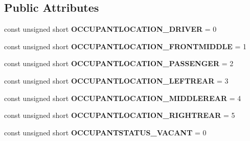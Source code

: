 \subsection*{Public Attributes}
\begin{DoxyCompactItemize}
\item 
\hypertarget{interfaceVehicle_1_1OccupantStatus_a0ea69a81c1da65a2d4c3b7d571e10ee9}{const unsigned short {\bfseries O\-C\-C\-U\-P\-A\-N\-T\-L\-O\-C\-A\-T\-I\-O\-N\-\_\-\-D\-R\-I\-V\-E\-R} = 0}\label{interfaceVehicle_1_1OccupantStatus_a0ea69a81c1da65a2d4c3b7d571e10ee9}

\item 
\hypertarget{interfaceVehicle_1_1OccupantStatus_aa3d7c15b7ff786f0a6438c6aec1f2712}{const unsigned short {\bfseries O\-C\-C\-U\-P\-A\-N\-T\-L\-O\-C\-A\-T\-I\-O\-N\-\_\-\-F\-R\-O\-N\-T\-M\-I\-D\-D\-L\-E} = 1}\label{interfaceVehicle_1_1OccupantStatus_aa3d7c15b7ff786f0a6438c6aec1f2712}

\item 
\hypertarget{interfaceVehicle_1_1OccupantStatus_a7de106804f74e42ffaff4824982affe7}{const unsigned short {\bfseries O\-C\-C\-U\-P\-A\-N\-T\-L\-O\-C\-A\-T\-I\-O\-N\-\_\-\-P\-A\-S\-S\-E\-N\-G\-E\-R} = 2}\label{interfaceVehicle_1_1OccupantStatus_a7de106804f74e42ffaff4824982affe7}

\item 
\hypertarget{interfaceVehicle_1_1OccupantStatus_aa72a4d119c0a070278e5df11cc909349}{const unsigned short {\bfseries O\-C\-C\-U\-P\-A\-N\-T\-L\-O\-C\-A\-T\-I\-O\-N\-\_\-\-L\-E\-F\-T\-R\-E\-A\-R} = 3}\label{interfaceVehicle_1_1OccupantStatus_aa72a4d119c0a070278e5df11cc909349}

\item 
\hypertarget{interfaceVehicle_1_1OccupantStatus_acba7110fdb470ea0aa14f1f9b567eeb5}{const unsigned short {\bfseries O\-C\-C\-U\-P\-A\-N\-T\-L\-O\-C\-A\-T\-I\-O\-N\-\_\-\-M\-I\-D\-D\-L\-E\-R\-E\-A\-R} = 4}\label{interfaceVehicle_1_1OccupantStatus_acba7110fdb470ea0aa14f1f9b567eeb5}

\item 
\hypertarget{interfaceVehicle_1_1OccupantStatus_a94e656f2f0107d30be000a7cb2533db7}{const unsigned short {\bfseries O\-C\-C\-U\-P\-A\-N\-T\-L\-O\-C\-A\-T\-I\-O\-N\-\_\-\-R\-I\-G\-H\-T\-R\-E\-A\-R} = 5}\label{interfaceVehicle_1_1OccupantStatus_a94e656f2f0107d30be000a7cb2533db7}

\item 
\hypertarget{interfaceVehicle_1_1OccupantStatus_ae3d0ed34503e32a132a14d25601e99f3}{const unsigned short {\bfseries O\-C\-C\-U\-P\-A\-N\-T\-S\-T\-A\-T\-U\-S\-\_\-\-V\-A\-C\-A\-N\-T} = 0}\label{interfaceVehicle_1_1OccupantStatus_ae3d0ed34503e32a132a14d25601e99f3}


\end{DoxyCompactItemize}
